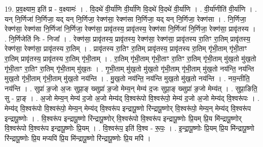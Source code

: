 \documentclass[17pt]{extarticle}
\begin{document}
19. प्र॒व॒क्ष्याम॒ इति॑ प्र - व॒क्ष्यामः॑ । . वि॒दथे॑ वी॒र्या॑णि वी॒र्या॑णि वि॒दथे॑ वि॒दथे॑ वी॒र्या॑णि । . वी॒र्या॑णीति॑ वी॒र्या॑णि । . यन् नि॒र्णिजा॑ नि॒र्णिजा॒ यद् यन् नि॒र्णिजा॒ रेक्ण॑सा॒ रेक्ण॑सा नि॒र्णिजा॒ यद् यन् नि॒र्णिजा॒ रेक्ण॑सा । . नि॒र्णिजा॒ रेक्ण॑सा॒ रेक्ण॑सा नि॒र्णिजा॑ नि॒र्णिजा॒ रेक्ण॑सा॒ प्रावृ॑तस्य॒ प्रावृ॑तस्य॒ रेक्ण॑सा नि॒र्णिजा॑ नि॒र्णिजा॒ रेक्ण॑सा॒ प्रावृ॑तस्य । . नि॒र्णिजेति॑ निः - निजा᳚ । . रेक्ण॑सा॒ प्रावृ॑तस्य॒ प्रावृ॑तस्य॒ रेक्ण॑सा॒ रेक्ण॑सा॒ प्रावृ॑तस्य रा॒तिꣳ रा॒तिम् प्रावृ॑तस्य॒ रेक्ण॑सा॒ रेक्ण॑सा॒ प्रावृ॑तस्य रा॒तिम् । . प्रावृ॑तस्य रा॒तिꣳ रा॒तिम् प्रावृ॑तस्य॒ प्रावृ॑तस्य रा॒तिम् गृ॑भी॒ताम् गृ॑भी॒ताꣳ रा॒तिम् प्रावृ॑तस्य॒ प्रावृ॑तस्य रा॒तिम् गृ॑भी॒ताम् । . रा॒तिम् गृ॑भी॒ताम् गृ॑भी॒ताꣳ रा॒तिꣳ रा॒तिम् गृ॑भी॒ताम् मु॑ख॒तो मु॑ख॒तो गृ॑भी॒ताꣳ रा॒तिꣳ रा॒तिम् गृ॑भी॒ताम् मु॑ख॒तः । . गृ॒भी॒ताम् मु॑ख॒तो मु॑ख॒तो गृ॑भी॒ताम् गृ॑भी॒ताम् मु॑ख॒तो नय॑न्ति॒ नय॑न्ति मुख॒तो गृ॑भी॒ताम् गृ॑भी॒ताम् मु॑ख॒तो नय॑न्ति । . मु॒ख॒तो नय॑न्ति॒ नय॑न्ति मुख॒तो मु॑ख॒तो नय॑न्ति । . नय॒न्तीति॒ नय॑न्ति । . सुप्रा॑ ङ॒जो अ॒जः सुप्रा॒ङ् ख्सुप्रा॑ ङ॒जो मेम्य॒न् मेम्य॑ द॒जः सुप्रा॒ङ् ख्सुप्रा॑ ङ॒जो मेम्य॑त् । . सुप्रा॒ङिति॒ सु - प्रा॒ङ् । . अ॒जो मेम्य॒न् मेम्य॑ द॒जो अ॒जो मेम्य॑द् वि॒श्वरू॑पो वि॒श्वरू॑पो॒ मेम्य॑ द॒जो अ॒जो मेम्य॑द् वि॒श्वरू॑पः । . मेम्य॑द् वि॒श्वरू॑पो वि॒श्वरू॑पो॒ मेम्य॒न् मेम्य॑द् वि॒श्वरू॑प इन्द्रापू॒ष्णो रि॑न्द्रापू॒ष्णोर् वि॒श्वरू॑पो॒ मेम्य॒न् मेम्य॑द् वि॒श्वरू॑प इन्द्रापू॒ष्णोः । . वि॒श्वरू॑प इन्द्रापू॒ष्णो रि॑न्द्रापू॒ष्णोर् वि॒श्वरू॑पो वि॒श्वरू॑प इन्द्रापू॒ष्णोः प्रि॒यम् प्रि॒य मि॑न्द्रापू॒ष्णोर् वि॒श्वरू॑पो वि॒श्वरू॑प इन्द्रापू॒ष्णोः प्रि॒यम् । . वि॒श्वरू॑प॒ इति॑ वि॒श्व - रू॒पः॒ । . इ॒न्द्रा॒पू॒ष्णोः प्रि॒यम् प्रि॒य मि॑न्द्रापू॒ष्णो रि॑न्द्रापू॒ष्णोः प्रि॒य मप्यपि॑ प्रि॒य मि॑न्द्रापू॒ष्णो रि॑न्द्रापू॒ष्णोः प्रि॒य मपि॑ । \newline
\end{document}
